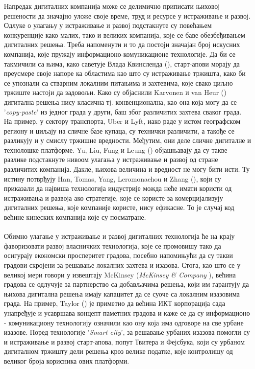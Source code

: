 \documentclass{article}
\begin{document}
\\\\\\\\\\
Напредак дигиталних компанија може се делимично приписати њиховој решености да значајно уложе своје време, труд и ресурсе у истраживање и развој. Одлуке о улагању у истраживање и развој подстакнуте су повећањем конкуренције како малих, тако и великих компанија, које се баве обезбеђивањем дигиталних решења. Треба напоменути и то да постоји значајан број искусних компанија, које пружају информационо-комуникационе технологије. Да би се такмичили са њима, како саветује Влада Квинсленда (\cite{q_2016}), старт-апови морају да преусмере своје напоре ка областима као што су истраживање тржишта, како би се упознали са стварним локалним питањима и захтевима, које свако циљно тржиште настоји да задовољи. Како су објаснили Karvonen и van Heur (\cite{v_h_2014}) дигитална решења нису класична тј. конвенционална, као она која могу да се '\textit{copy-paste}' из једног града у други, баш због различитих захтева сваког града. На пример, у сектору транспорта, Uber и Lyft, иако раде у истом географском региону и циљају на сличне базе купаца, су технички различити, а такође се разликују и у смислу тржишне вредности. Међутим, они деле сличне дигиталне и технолошке платформе. Yu, Liu, Fung и Leung  (\cite{l_2018}) објашњавају да су такве разлике подстакнуте нивоом улагања у истраживање и развој од стране различитих компанија. Дакле, њихова величина и вредност не могу бити исти. Ту истину потврђују Han, Tomas, Yang, Leromonachou и Zhang (\cite{zhang_2017}), који су приказали да највиша технологија индустрије можда неће имати користи од истраживања и развоја ако стратегије, које се користе за комерцијализују дигиталних решења, које компаније користе, нису ефикасне. То је случај код већине кинеских компанија које су посматране.
\\\\
Обимно улагање у истраживање и развој дигиталних технологија ће на крају фаворизовати развој власничких технологија, које се промовишу тако да осигурају економски просперитет градова, посебно напомињући да су такви градови скројени за решавање локалних захтева и изазова. Стога, као што се у великој мери говори у извештају McKinsey (\textit{McKinsey \& Company} \cite{mc_2018a}), већина градова се одлучује за партнерство са добављачима решења, који им гарантују да њихова дигитална решења имају капацитет да се суоче са локалним изазовима града. На пример, Taylor (\cite{t_2014}) је приметио да већина ИКТ корпорација сада унапређује и усавршава концепт паметних градова и каже се да су информационо - комуникациону технологију означили као ону која има одговоре на све урбане изазове. Поред технологије '\textit{Smart city}', за решавање урбаних изазова помогли су и истраживање и развој старт-апова, попут Твитера и Фејсбука, који су урбаном дигиталном тржишту дели решења кроз велике податке, које контролишу од великог броја корисника ових платформи.
\newpage
\end{document}
